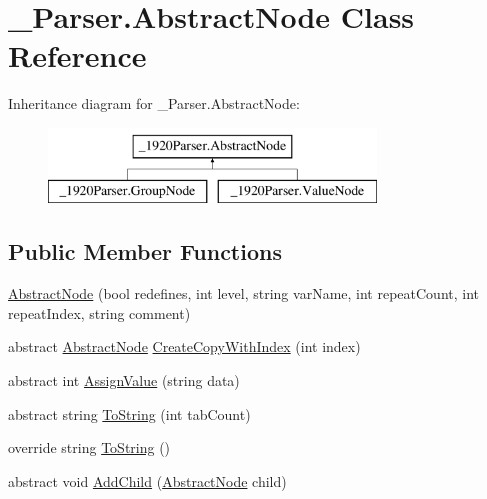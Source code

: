 \hypertarget{class__1920_parser_1_1_abstract_node}{}\section{\+\_\+Parser.\+Abstract\+Node Class Reference}
\label{class__1920_parser_1_1_abstract_node}


 


Inheritance diagram for \+\_\+Parser.\+Abstract\+Node\+:\begin{figure}[H]
\begin{center}
\leavevmode
\includegraphics[height=2.000000cm]{class__1920_parser_1_1_abstract_node}
\end{center}
\end{figure}
\subsection*{Public Member Functions}
\begin{DoxyCompactItemize}
\item 
\hyperlink{class__1920_parser_1_1_abstract_node_aebc3c9efb2855add3285f717edd5ca86}{Abstract\+Node} (bool redefines, int level, string var\+Name, int repeat\+Count, int repeat\+Index, string comment)
\item 
abstract \hyperlink{class__1920_parser_1_1_abstract_node}{Abstract\+Node} \hyperlink{class__1920_parser_1_1_abstract_node_a636ae975a7e037fb31c4d4341e222c1b}{Create\+Copy\+With\+Index} (int index)
\item 
abstract int \hyperlink{class__1920_parser_1_1_abstract_node_a457498d3ec29d4c2af707aad2cf3bfc9}{Assign\+Value} (string data)
\item 
abstract string \hyperlink{class__1920_parser_1_1_abstract_node_ae41877e0bad1b9ed1e4b5ae8c01bca60}{To\+String} (int tab\+Count)
\item 
override string \hyperlink{class__1920_parser_1_1_abstract_node_a2fef1588cfaa3d7979c8fd3af77d08d3}{To\+String} ()
\item 
abstract void \hyperlink{class__1920_parser_1_1_abstract_node_af6241531937bb83d55aea81268b97f0b}{Add\+Child} (\hyperlink{class__1920_parser_1_1_abstract_node}{Abstract\+Node} child)
\end{DoxyCompactItemize}
